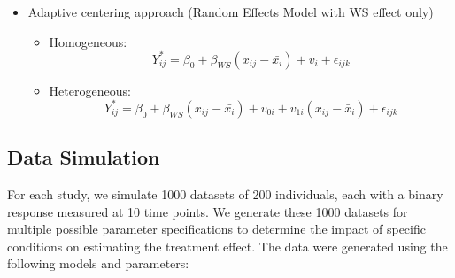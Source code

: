 \documentclass{article}
\begin{document}
\begin{itemize}
\begin{itemize}
\begin{equation}
                        \end{equation}
                \end{itemize}
            \item Adaptive centering approach (Random Effects Model with WS effect only)
                \begin{itemize}
                    \item Homogeneous:
                        \begin{equation}
                            Y_{ij}^* = \beta_{0} + \beta_{WS}(x_{ij} - \bar{x_i}) + v_i + \epsilon_{ijk} 
                        \end{equation}
                    \item Heterogeneous:
                        \begin{equation}
                            Y_{ij}^* = \beta_{0} + \beta_{WS}(x_{ij} - \bar{x_i}) + v_{0i} + v_{1i}(x_{ij}-\bar{x}_i) + \epsilon_{ijk} 
                        \end{equation}
                \end{itemize}
        \end{itemize}  
            
    \subsection{Data Simulation}
        For each study, we simulate 1000 datasets of 200 individuals, each with a binary response measured at 10 time points. We generate these 1000 datasets for multiple possible parameter specifications to determine the impact of specific conditions on estimating the treatment effect. The data were generated using the following models and parameters: 
\end{document}

